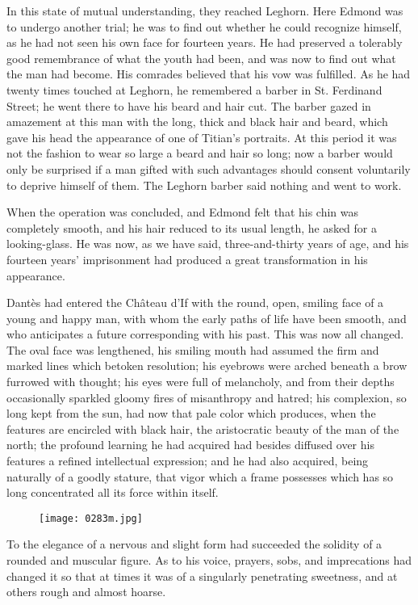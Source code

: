 In this state of mutual understanding, they reached Leghorn. Here
Edmond was to undergo another trial; he was to find out whether he
could recognize himself, as he had not seen his own face for fourteen
years. He had preserved a tolerably good remembrance of what the youth
had been, and was now to find out what the man had become. His comrades
believed that his vow was fulfilled. As he had twenty times touched at
Leghorn, he remembered a barber in St. Ferdinand Street; he went there
to have his beard and hair cut. The barber gazed in amazement at this
man with the long, thick and black hair and beard, which gave his head
the appearance of one of Titian’s portraits. At this period it was not
the fashion to wear so large a beard and hair so long; now a barber
would only be surprised if a man gifted with such advantages should
consent voluntarily to deprive himself of them. The Leghorn barber said
nothing and went to work.

When the operation was concluded, and Edmond felt that his chin was
completely smooth, and his hair reduced to its usual length, he asked
for a looking-glass. He was now, as we have said, three-and-thirty
years of age, and his fourteen years’ imprisonment had produced a great
transformation in his appearance.

Dantès had entered the Château d’If with the round, open, smiling face
of a young and happy man, with whom the early paths of life have been
smooth, and who anticipates a future corresponding with his past. This
was now all changed. The oval face was lengthened, his smiling mouth
had assumed the firm and marked lines which betoken resolution; his
eyebrows were arched beneath a brow furrowed with thought; his eyes
were full of melancholy, and from their depths occasionally sparkled
gloomy fires of misanthropy and hatred; his complexion, so long kept
from the sun, had now that pale color which produces, when the features
are encircled with black hair, the aristocratic beauty of the man of
the north; the profound learning he had acquired had besides diffused
over his features a refined intellectual expression; and he had also
acquired, being naturally of a goodly stature, that vigor which a frame
possesses which has so long concentrated all its force within itself.

\begin{figure}[ht]
\texttt{[image: 0283m.jpg]}
\end{figure}

To the elegance of a nervous and slight form had succeeded the solidity
of a rounded and muscular figure. As to his voice, prayers, sobs, and
imprecations had changed it so that at times it was of a singularly
penetrating sweetness, and at others rough and almost hoarse.

